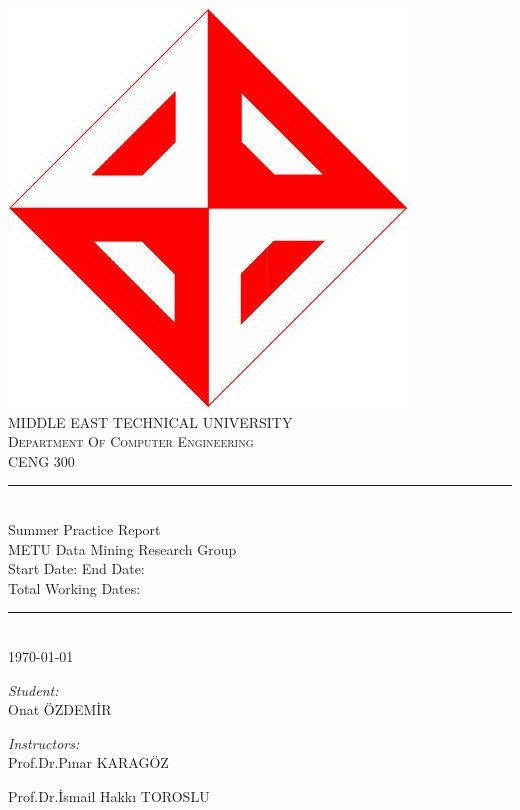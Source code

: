 \documentclass[12pt]{article}
\begin{document}
	\begin{titlepage}
		\newcommand{\HRule}{\rule{\linewidth}{0.1mm}} 
		\center 
		\includegraphics[scale=0.12]{ceng.jpg} \\
		\vspace{1cm}
		\textsc{\Large MIDDLE EAST TECHNICAL UNIVERSITY}\\[0.5cm]
		\textsc{\large Department Of Computer Engineering}\\[0.5cm]
		\textsc{\large CENG 300}\\
		\HRule \\[0.4cm]
		{ \huge \Large Summer Practice Report }\\[0.4cm]
		METU Data Mining Research Group \\
		Start Date: \hspace{25px}  End Date: \\
		Total Working Dates:
		
		\HRule \\[0.3cm]
		{\today}\\[1.2cm]
		
		
		\begin{minipage}{0.4\textwidth}
			\begin{flushleft} \large
				
				\emph{Student:}\\
				Onat ÖZDEMİR
			\end{flushleft}
			
			
		\end{minipage}
		\begin{minipage}{0.4\textwidth}
			\begin{flushright} \large
				\emph{Instructors:} \\
				Prof.Dr.Pınar KARAGÖZ \\
			\end{flushright}
			\begin{flushright} \large
				Prof.Dr.İsmail Hakkı TOROSLU \\
			\end{flushright}
		\end{minipage}\\[1cm]
		\vspace{2cm}
		

\end{titlepage}
\end{document}
